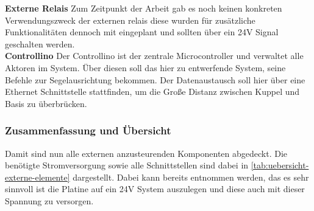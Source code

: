 \noindent\textbf{Externe Relais}\newline
Zum Zeitpunkt der Arbeit gab es noch keinen konkreten Verwendungszweck der externen relais diese wurden für zusätzliche Funktionalitäten dennoch mit eingeplant und sollten über ein 24V Signal geschalten werden.\\

\noindent\textbf{Controllino}\newline
Der Controllino ist der zentrale Microcontroller und verwaltet alle Aktoren im System. Über diesen soll das hier zu entwerfende System, seine Befehle zur Segelausrichtung bekommen. Der Datenaustausch soll hier über eine Ethernet Schnittstelle stattfinden, um die Große Distanz zwischen Kuppel und Basis zu überbrücken.

\subsubsection{Zusammenfassung und Übersicht}
Damit sind nun alle externen anzusteurenden Komponenten abgedeckt. Die benötigte Stromversorgung sowie alle Schnittstellen sind dabei in \autoref{tab:uebersicht-externe-elemente} dargestellt. Dabei kann bereits entnommen werden, das es sehr sinnvoll ist die Platine auf ein 24V System auszulegen und diese auch mit dieser Spannung zu versorgen.
